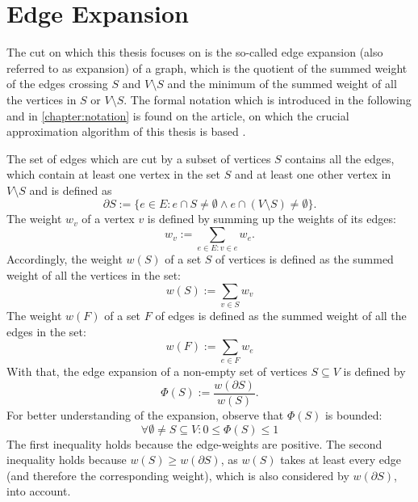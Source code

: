 \section{Edge Expansion}
The cut on which this thesis focuses on is the so-called edge expansion (also referred to as expansion) of a graph, which is the quotient of the summed weight of the edges crossing $S$ and $V\setminus S$ and the minimum of the summed weight of all the vertices in $S$ or $V\setminus S$. The formal notation which is introduced in the following and in \cref{chapter:notation} is found on the article, on which the crucial approximation algorithm of this thesis is based \cite{ChanLTZ16}.

The set of edges which are cut by a subset of vertices $S$ contains all the edges, which contain at least one vertex in the set $S$ and at least one other vertex in $V\setminus S$ and is defined as \begin{equation}
\partial S:= \{e\in E : e \cap S \neq \emptyset \land  e \cap (V \setminus S) \neq \emptyset  \}.
\end{equation} 
The weight $w_v$ of a vertex $v$ is defined by summing up the weights of its edges: \begin{equation}
w_v := \sum_{e\in E: v\in e} w_e.
\end{equation} %
Accordingly, the weight $w(S)$ of a set $S$ of vertices is defined as the summed weight of all the vertices in the set: 
\begin{equation}
	w(S) := \sum_{v\in S} w_v
\end{equation}
The weight $w(F)$ of a set $F$ of edges is defined as the summed weight of all the edges in the set: 
\begin{equation}
w(F) := \sum_{e\in F} w_e
\end{equation}
With that, the edge expansion of a non-empty set of vertices $S \subseteq V$ is defined by \begin{equation}
\Phi(S):= \frac{w(\partial S)}{w(S)}.
\end{equation}
For better understanding of the expansion, observe that $\Phi(S)$ is bounded: \begin{equation} \label{eq:phi_bounded}
\forall \emptyset \neq S \subseteq V : 0\le \Phi(S) \le 1 
\end{equation} The first inequality holds because the edge-weights are positive. The second inequality holds because $w(S) \ge w(\partial S)$, as $w(S)$ takes at least every edge (and therefore the corresponding weight), which is also considered by $w(\partial S)$, into account.


